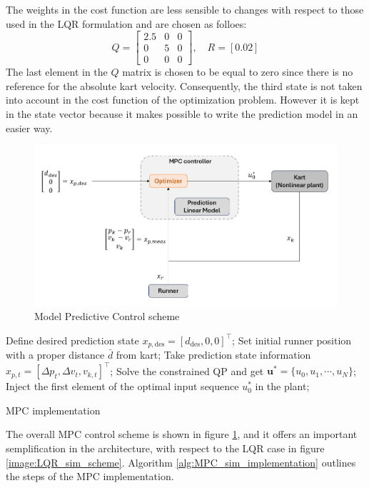 \documentclass[a4paper,12pt,oneside]{book}
\begin{document}
\bigskip
The weights in the cost function are less sensible to changes with respect to those used in the LQR formulation and are chosen as folloes:
\begin{equation}
    Q =
    \begin{bmatrix}
        2.5 & 0 & 0 \\
        0 & 5 & 0 \\
        0 & 0 & 0
    \end{bmatrix},
    \quad
    R = [0.02]    
\end{equation}
The last element in the $Q$ matrix is chosen to be equal to zero since there is no reference for the absolute kart velocity.
Consequently, the third state is not taken into account in the cost function of the optimization problem.
However it is kept in the state vector because it makes possible to write the prediction model in an easier way.

\begin{figure}
	\centering
	\includegraphics[width=1.0\textwidth]{MPC_sim_scheme.png}
	\caption{Model Predictive Control scheme}
	\label{image:MPC_sim_scheme}
\end{figure}

\begin{algorithm}
\begin{algorithmic}[1]
	\State Define desired prediction state $x_{p,\text{des}} = [d_{\text{des}}, 0, 0]^\top$;
	\State Set initial runner position with a proper distance $\bar{d}$ from kart;
		\State Take prediction state information $x_{p,t} = [\Delta p_t, \Delta v_t, v_{k,t}]^\top$;
		\State Solve the constrained QP and get $\boldsymbol{u}^* = \{u_0, u_1, \cdots, u_N\}$; 
		\State Inject the first element of the optimal input sequence $u_0^*$ in the plant;
	\EndFor
\caption{MPC implementation}
\label{alg:MPC_sim_implementation}
\end{algorithmic}
\end{algorithm}
\bigskip
The overall MPC control scheme is shown in figure \ref{image:MPC_sim_scheme}, and it offers an important semplification in the architecture, with respect to the LQR case in figure \ref{image:LQR_sim_scheme}.
 Algorithm \ref{alg:MPC_sim_implementation} outlines the steps of the MPC implementation.
\end{document}
